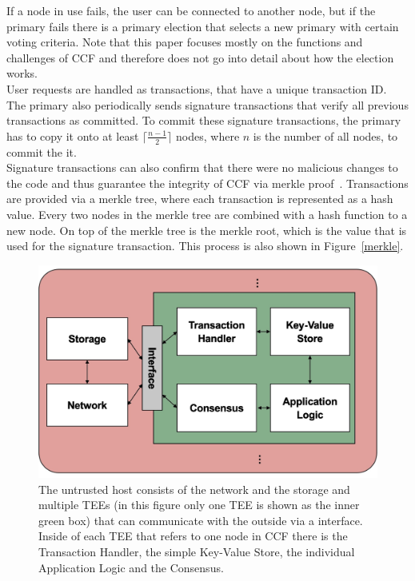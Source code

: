  If a node in use fails, the user can be connected to another node, but if the primary fails there is a primary election that selects a new primary with certain voting criteria. Note that this paper focuses mostly on the functions and challenges of CCF and therefore does not go into detail about how the election works. \\
 User requests are handled as transactions, that have a unique transaction ID. The primary also periodically sends signature transactions that verify all previous transactions as committed. To commit these signature transactions, the primary has to copy it onto at least $\lceil\frac{n-1}{2}\rceil$ nodes, where $n$ is the number of all nodes, to commit the it.\\
  Signature transactions can also confirm that there were no malicious changes to the code and thus guarantee the integrity of CCF via merkle proof~\cite{merkle}. Transactions are provided via a merkle tree, where each transaction is represented as a hash value. Every two nodes in the merkle tree are combined with a hash function to a new node. On top of the merkle tree is the merkle root, which is the value that is used for the signature transaction. This process is also shown in Figure~\ref{merkle}.\\
  
  \begin{figure}[t]
	\includegraphics[scale=0.14]{pictures/ccf}
	\caption{The untrusted host consists of the network and the storage and multiple TEEs (in this figure only one TEE is shown as the inner green box) that can communicate with the outside via a interface. Inside of each TEE that refers to one node in CCF there is the Transaction Handler, the simple Key-Value Store, the individual Application Logic and the Consensus.}
	\label{ccf}
\end{figure}
  
